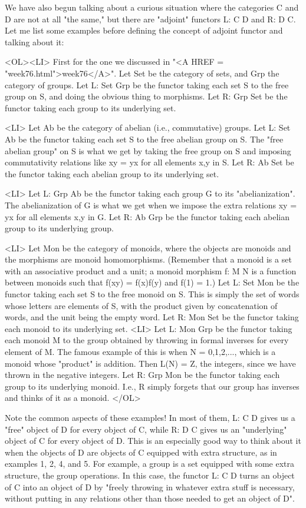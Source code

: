 We have also begun talking about a curious situation where the
categories C and D are not at all "the same," but there are "adjoint"
functors L: C \to  D and R: D \to  C.  Let me list some examples before
defining the concept of adjoint functor and talking about it:


<OL><LI>
 First for the one we discussed in "<A HREF =
"week76.html">week76</A>".  Let Set be the category of sets, and
Grp the category of groups.  Let L: Set \to  Grp be the functor taking
each set S to the free group on S, and doing the obvious thing to
morphisms.  Let R: Grp \to  Set be the functor taking each group to its
underlying set.

<LI>
Let Ab be the category of abelian (i.e., commutative) groups.  Let L:
Set \to  Ab be the functor taking each set S to the free abelian group
on S.  The "free abelian group" on S is what we get by taking
the free group on S and imposing commutativity relations like xy = yx
for all elements x,y in S.  Let R: Ab \to  Set be the functor taking
each abelian group to its underlying set.

<LI>
Let L: Grp \to  Ab be the functor taking each group G to its
"abelianization".  The abelianization of G is what we get when
we impose the extra relations xy = yx for all elements x,y in G.  Let R:
Ab \to  Grp be the functor taking each abelian group to its underlying
group.

<LI>
Let Mon be the category of monoids, where the objects are monoids and
the morphisms are monoid homomorphisms.  (Remember that a monoid is a
set with an associative product and a unit; a monoid morphism f: M \to  N
is a function between monoids such that f(xy) = f(x)f(y) and f(1) = 1.)
Let L: Set \to  Mon be the functor taking each set S to the free monoid on
S.  This is simply the set of words whose letters are elements of S,
with the product given by concatenation of words, and the unit being the
empty word.  Let R: Mon \to  Set be the functor taking each monoid to its
underlying set.  
<LI>
Let L: Mon \to  Grp be the functor taking each monoid M to the group
obtained by throwing in formal inverses for every element of M.  The
famous example of this is when N = {0,1,2,...}, which is a monoid
whose "product" is addition.  Then L(N) = Z, the integers, since we have
thrown in the negative integers.  Let R: Grp \to  Mon be the functor
taking each group to its underlying monoid.  I.e., R simply forgets that
our group has inverses and thinks of it as a monoid.
</OL>

Note the common aspects of these examples!  In most of them, L: C \to 
D gives us a "free" object of D for every object of C, while
R: D \to  C gives us an "underlying" object of C for every
object of D.  This is an especially good way to think about it when the
objects of D are objects of C equipped with extra structure, as in
examples 1, 2, 4, and 5.  For example, a group is a set equipped with
some extra structure, the group operations.  In this case, the functor
L: C \to  D turns an object of C into an object of D by "freely
throwing in whatever extra stuff is necessary, without putting in any
relations other than those needed to get an object of D".


